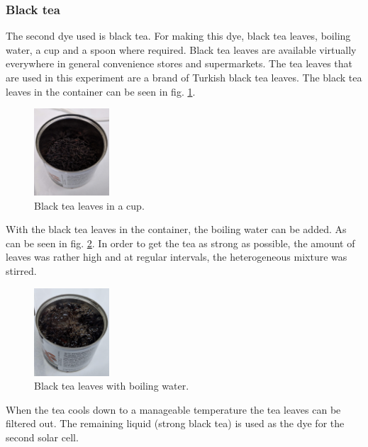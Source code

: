 \documentclass[conference]{IEEEtran}
\begin{document}
\subsubsection{Black tea}
The second dye used is black tea. For making this dye, black tea leaves, boiling water, a cup and a spoon where required. Black tea leaves are available virtually everywhere in general convenience stores and supermarkets. The tea leaves that are used in this experiment are a brand of Turkish black tea leaves. The black tea leaves in the container can be seen in fig. \ref{fig:black tea in cup}. 

\begin{figure}[h]
\centering
\includegraphics[width=0.25\textwidth]{15BlackTea1.jpg}
\caption{Black tea leaves in a cup.}
\label{fig:black tea in cup} %
\end{figure}

With the black tea leaves in the container, the boiling water can be added. As can be seen in  fig. \ref{fig:add hot water}. In order to get the tea as strong as possible, the amount of leaves was rather high and at regular intervals, the heterogeneous mixture was stirred. 

\begin{figure}[H]
\centering
\includegraphics[width=0.25\textwidth]{16BlackTea2.jpg}
\caption{Black tea leaves with boiling water.}
\label{fig:add hot water} %
\end{figure}

When the tea cools down to a manageable temperature the tea leaves can be filtered out. The remaining liquid (strong black tea) is used as the dye for the second solar cell.
\end{document}
